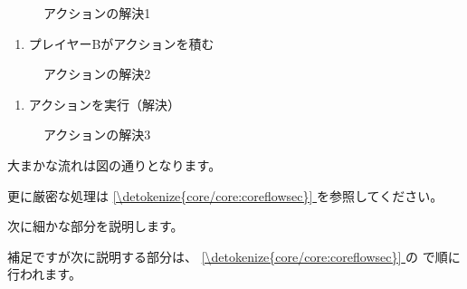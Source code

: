 \documentclass[letterpaper,10pt,dvipdfmx]{sphinxmanual}
\begin{document}
\begin{figure}[htbp]
\centering
\capstart

\noindent{}
\caption{アクションの解決1}\label{\detokenize{common/common:id49}}\label{\detokenize{common/common:action-request1-image}}\end{figure}
\begin{enumerate}
%
\setcounter{enumi}{1}
\item {} 
\sphinxAtStartPar
プレイヤーBがアクションを積む

\end{enumerate}

\begin{figure}[htbp]
\centering
\capstart

\noindent{}
\caption{アクションの解決2}\label{\detokenize{common/common:id50}}\label{\detokenize{common/common:action-request2-image}}\end{figure}
\begin{enumerate}
%
\setcounter{enumi}{2}
\item {} 
\sphinxAtStartPar
アクションを実行（解決）

\end{enumerate}

\begin{figure}[htbp]
\centering
\capstart

\noindent{}
\caption{アクションの解決3}\label{\detokenize{common/common:id51}}\label{\detokenize{common/common:action-request3-image}}\end{figure}

\sphinxAtStartPar
大まかな流れは図の通りとなります。

\sphinxAtStartPar
更に厳密な処理は \hyperref[\detokenize{core/core:coreflowsec}]{\ref{\detokenize{core/core:coreflowsec}} } を参照してください。

\sphinxAtStartPar
次に細かな部分を説明します。

\sphinxAtStartPar
補足ですが次に説明する部分は、 \hyperref[\detokenize{core/core:coreflowsec}]{\ref{\detokenize{core/core:coreflowsec}} } の {\hyperref[\detokenize{core/core:actresolve}]{}} で順に行われます。
\end{document}

